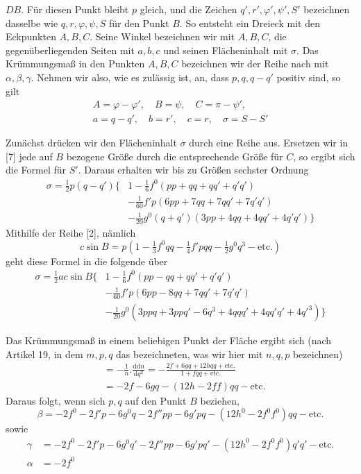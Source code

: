 %
\(DB\). Für diesen Punkt bleibt \(p\) gleich, und die Zeichen \(q',r',\varphi',\psi',S'\) bezeichnen dasselbe wie \(q,r,\varphi,\psi,S\) für den Punkt \(B\). So entsteht ein Dreieck mit den Eckpunkten \(A,B,C\). Seine Winkel bezeichnen wir mit \(A,B,C\), die gegenüberliegenden Seiten mit \(a,b,c\) und seinen Flächeninhalt mit \(\sigma\). Das Krümmungsmaß in den Punkten \(A,B,C\) bezeichnen wir der Reihe nach mit \(\alpha,\beta,\gamma\). Nehmen wir also, wie es zulässig ist, an, dass \(p,q,q-q'\) positiv sind, so gilt
\[
\begin{gathered}
A=\varphi-\varphi',\quad B=\psi,\quad C=\pi-\psi',\\
a=q-q',\quad b=r',\quad c=r,\quad\sigma=S-S'
\end{gathered}
\]

Zunächst drücken wir den Flächeninhalt \(\sigma\) durch eine Reihe aus. Ersetzen wir in [7] jede auf \(B\) bezogene Größe durch die entsprechende Größe für \(C\), so ergibt sich die Formel für \(S'\). Daraus erhalten wir bis zu Größen sechster Ordnung
\[
\begin{aligned}
\sigma=\tfrac{1}{2}p(q-q')\{&1-\tfrac{1}{6}f^0(pp+qq+qq'+q'q')\\
&-\tfrac{1}{60}f'p(6pp+7qq+7qq'+7q'q')\\
&-\tfrac{1}{20}g^0(q+q')(3pp+4qq+4qq'+4q'q')\}
\end{aligned}
\]
Mithilfe der Reihe [2], nämlich
\[
c\sin B=p(1-\tfrac{1}{3}f^0qq-\tfrac{1}{4}f'pqq-\tfrac{1}{2}g^0q^3-\text{etc.})
\]
geht diese Formel in die folgende über
\[
\begin{aligned}
\sigma=\tfrac{1}{2}ac\sin B\{&1-\tfrac{1}{6}f^0(pp-qq+qq'+q'q')\\
&-\tfrac{1}{60}f'p(6pp-8qq+7qq'+7q'q')\\
&-\tfrac{1}{20}g^0(3ppq+3ppq'-6q^3+4qqq'+4qq'q'+4q'^3)\}
\end{aligned}
\]

Das Krümmungsmaß in einem beliebigen Punkt der Fläche ergibt sich (nach Artikel 19, in dem \(m,p,q\) das bezeichneten, was wir hier mit \(n,q,p\) bezeichnen)
\[
\begin{aligned}
&=-\frac{1}{n}\mathord{.}\frac{\mathrm{d}\mathrm{d}n}{\mathrm{d}q^2}=-\frac{2f+6gq+12hqq+\text{etc.}}{1+fqq+\text{etc.}}\\
&=-2f-6gq-(12h-2ff)qq-\text{etc.}
\end{aligned}
\]
Daraus folgt, wenn sich \(p,q\) auf den Punkt \(B\) beziehen,
\[
\beta=-2f^0-2f'p-6g^0q-2f''pp-6g'pq-(12h^0-2f^0f^0)qq-\text{etc.}
\]
sowie
\[
\begin{aligned}
\gamma&=-2f^0-2f'p-6g^0q'-2f''pp-6g'pq'-(12h^0-2f^0f^0)q'q'-\text{etc.}\\
\alpha&=-2f^0
\end{aligned}
\]
